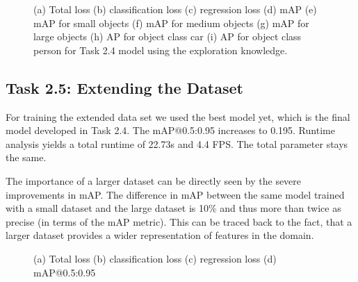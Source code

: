\documentclass{article}
\begin{document}
\newpage
\begin{figure}[t!]
    \centering
    \subfigure[]{}
    \subfigure[]{}
    \subfigure[]{}
    \subfigure[]{}
    \subfigure[]{}
    \subfigure[]{}
    \subfigure[]{}
    \subfigure[]{}
    \subfigure[]{}
    \caption{(a) Total loss (b) classification loss (c) regression loss (d) mAP (e) mAP for small objects (f) mAP for medium objects (g) mAP for large objects (h) AP for object class car (i) AP for object class person for Task 2.4 model using the exploration knowledge.}
    \label{fig:loss-2-4}
\end{figure}
\newpage

\subsection*{Task 2.5: Extending the Dataset}

For training the extended data set we used the best model yet, which is the final model developed in Task 2.4. The mAP@0.5:0.95 increases to 0.195. Runtime analysis yields a total runtime of 22.73s and 4.4 FPS. The total parameter stays the same.

The importance of a larger dataset can be directly seen by the severe improvements in mAP. The difference in mAP between the same model trained with a small dataset and the large dataset is 10\% and thus more than twice as precise (in terms of the mAP metric). This can be traced back to the fact, that a larger dataset provides a wider representation of features in the domain.

\begin{figure}[t!]
    \centering
    \subfigure[]{}
    \vspace{-0.15cm}
    \subfigure[]{}
    \subfigure[]{}
    \subfigure[]{}
    \caption{(a) Total loss (b) classification loss (c) regression loss (d) mAP@0.5:0.95}
    \label{fig:loss-2-5}
\end{figure}
\end{document}
